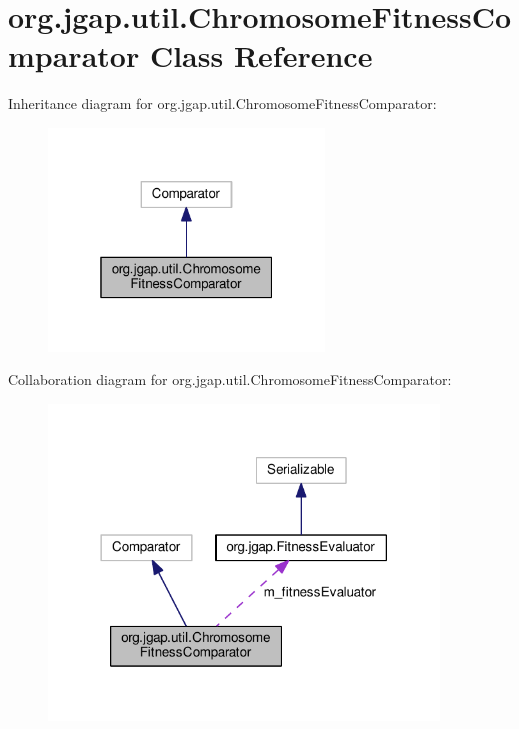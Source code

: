 \hypertarget{classorg_1_1jgap_1_1util_1_1_chromosome_fitness_comparator}{\section{org.\-jgap.\-util.\-Chromosome\-Fitness\-Comparator Class Reference}
\label{classorg_1_1jgap_1_1util_1_1_chromosome_fitness_comparator}
}


Inheritance diagram for org.\-jgap.\-util.\-Chromosome\-Fitness\-Comparator\-:
\nopagebreak
\begin{figure}[H]
\begin{center}
\leavevmode
\includegraphics[width=208pt]{classorg_1_1jgap_1_1util_1_1_chromosome_fitness_comparator__inherit__graph}
\end{center}
\end{figure}


Collaboration diagram for org.\-jgap.\-util.\-Chromosome\-Fitness\-Comparator\-:
\nopagebreak
\begin{figure}[H]
\begin{center}
\leavevmode
\includegraphics[width=294pt]{classorg_1_1jgap_1_1util_1_1_chromosome_fitness_comparator__coll__graph}
\end{center}
\end{figure}

